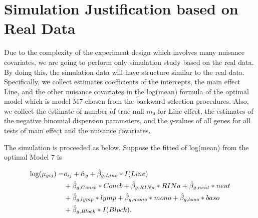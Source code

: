 \documentclass[12pt, letter]{article}\usepackage[]{graphicx}\usepackage[]{color}
\begin{document}
\section{ Simulation Justification based on Real Data}
Due to the complexity of the experiment design which involves many nuisance covariates, we are going to perform only simulation study based on the real data. By doing this, the simulation data will have structure similar to the real data. Specifically, we collect estimates coefficients of the intercepts, the main effect Line, and the other nuisance covariates in the log(mean) formula of the optimal model which is model M7 chosen from the backward selection procedures. Also, we collect  the estimate of  number of true null $m_{0}$ for Line effect,  the estimates of the negative binomial dispersion parameters, and the $q$-values of all genes for all tests of main effect and the nuisance covariates.

The simulation is proceeded as below. Suppose the fitted of log(mean)  from the optimal  Model 7 is 

\begin{align}\label{eq1}
\log(\mu_{gij}) = & o_{ij} +\hat{\alpha}_g + \hat{\beta}_{g,Line}*I(Line) \notag\\
     & +  \hat{\beta}_{g,Concb}*Concb +  \hat{\beta}_{g,RINa}*RINa + \hat{\beta}_{g,neut}*neut \notag \\
     & + \hat{\beta}_{g,lymp}*lymp + \hat{\beta}_{g,mono}*mono + \hat{\beta}_{g,baso}*baso \notag\\
    &  + \hat{\beta}_{g,Block}*I(Block).
\end{align}
\end{document}
